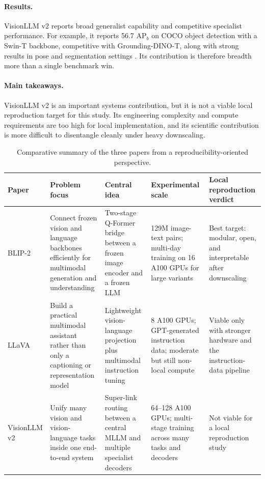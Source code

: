 \documentclass[11pt]{article}
\begin{document}
\paragraph{Results.}
VisionLLM v2 reports broad generalist capability and competitive specialist performance.
For example, it reports 56.7 AP$_b$ on COCO object detection with a Swin-T backbone,
competitive with Grounding-DINO-T, along with strong results in pose and segmentation
settings \citep{wu2024visionllmv2}. Its contribution is therefore breadth more than a
single benchmark win.

\paragraph{Main takeaways.}
VisionLLM v2 is an important systems contribution, but it is not a viable local
reproduction target for this study. Its engineering complexity and compute requirements
are too high for local implementation, and its scientific contribution is more
difficult to disentangle cleanly under heavy downscaling.

\begin{table}[t]
\centering
\scriptsize
\setlength{\tabcolsep}{3pt}
\begin{tabularx}{\linewidth}{p{1.5cm} Y Y Y Y}
\toprule
Paper & Problem focus & Central idea & Experimental scale & Local reproduction verdict \\
\midrule
BLIP-2 & Connect frozen vision and language backbones efficiently for multimodal generation and understanding & Two-stage Q-Former bridge between a frozen image encoder and a frozen LLM & 129M image-text pairs; multi-day training on 16 A100 GPUs for large variants & Best target: modular, open, and interpretable after downscaling \\
LLaVA & Build a practical multimodal assistant rather than only a captioning or representation model & Lightweight vision-language projection plus multimodal instruction tuning & 8 A100 GPUs; GPT-generated instruction data; moderate but still non-local compute & Viable only with stronger hardware and the instruction-data pipeline \\
VisionLLM v2 & Unify many vision and vision-language tasks inside one end-to-end system & Super-link routing between a central MLLM and multiple specialist decoders & 64--128 A100 GPUs; multi-stage training across many tasks and decoders & Not viable for a local reproduction study \\
\bottomrule
\end{tabularx}
\caption{Comparative summary of the three papers from a reproducibility-oriented perspective.}
\label{tab:critique-summary}
\end{table}
\end{document}
